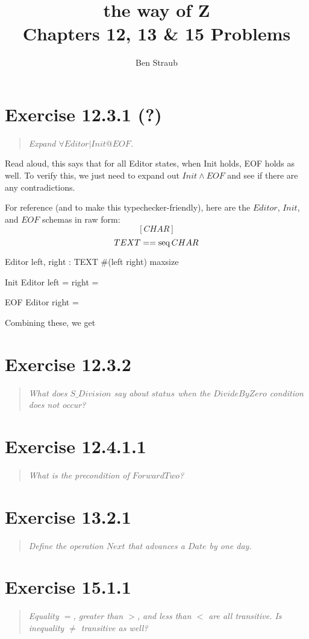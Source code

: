 \documentclass[10pt]{article}
\begin{document}
\title{the way of Z \\ Chapters 12, 13 \& 15 Problems}
\author{Ben Straub}
\maketitle

\section{Exercise 12.3.1 (?)}
\begin{quote}
  {\it
    Expand $\forall Editor | Init @ EOF$.
  }
\end{quote}
\tofinish{}
Read aloud, this says that for all Editor states, when Init holds, EOF holds as well. To verify
this, we just need to expand out $Init \land EOF$ and see if there are any contradictions.

For reference (and to make this typechecker-friendly), here are the $Editor$, $Init$, and $EOF$
schemas in raw form:
\[ [CHAR] \]
\[ TEXT == \mathop{\mathrm{seq}} CHAR \]
\begin{schema}{Editor}
  left, right : TEXT
  \where
  \#(left \cat right) \leq maxsize
\end{schema}
\begin{schema}{Init}
  Editor
  \where
  left = right = \langle \rangle
\end{schema}
\begin{schema}{EOF}
  Editor
  \where
  right = \langle \rangle  
\end{schema}

Combining these, we get


\section{Exercise 12.3.2}
\begin{quote}
  {\it
    What does $S\_Division$ say about $status$ when the $DivideByZero$ condition does not occur?
  }
\end{quote}


\section{Exercise 12.4.1.1}
\begin{quote}
  {\it
   What is the precondition of $ForwardTwo$? 
  }
\end{quote}



\section{Exercise 13.2.1}
\begin{quote}
  {\it
    Define the operation $Next$ that advances a $Date$ by one day.
  }
\end{quote}



\section{Exercise 15.1.1}
\begin{quote}
  {\it
    Equality $=$, greater than $>$, and less than $<$ are all transitive. Is inequality $\neq$
    transitive as well?
  }
\end{quote}
\end{document}
